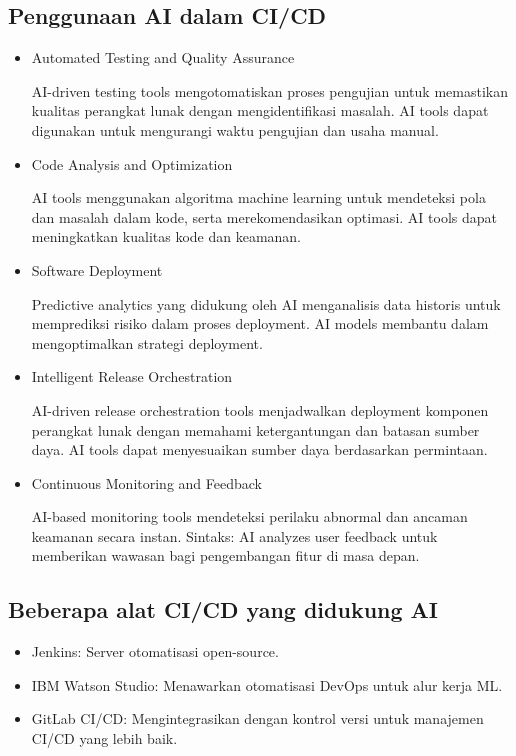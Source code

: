 \documentclass{article}
\begin{document}
\subsection{Penggunaan AI dalam CI/CD}
\begin{itemize}
    \item Automated Testing and Quality Assurance

          AI-driven testing tools mengotomatiskan proses pengujian untuk memastikan kualitas perangkat lunak dengan mengidentifikasi masalah. AI tools dapat digunakan untuk mengurangi waktu pengujian dan usaha manual.
    \item Code Analysis and Optimization

          AI tools menggunakan algoritma machine learning untuk mendeteksi pola dan masalah dalam kode, serta merekomendasikan optimasi. AI tools dapat meningkatkan kualitas kode dan keamanan.
    \item Software Deployment

          Predictive analytics yang didukung oleh AI menganalisis data historis untuk memprediksi risiko dalam proses deployment. AI models membantu dalam mengoptimalkan strategi deployment.
    \item Intelligent Release Orchestration

          AI-driven release orchestration tools menjadwalkan deployment komponen perangkat lunak dengan memahami ketergantungan dan batasan sumber daya. AI tools dapat menyesuaikan sumber daya berdasarkan permintaan.
    \item Continuous Monitoring and Feedback

          AI-based monitoring tools mendeteksi perilaku abnormal dan ancaman keamanan secara instan. Sintaks: AI analyzes user feedback untuk memberikan wawasan bagi pengembangan fitur di masa depan.
\end{itemize}

\subsection{Beberapa alat CI/CD yang didukung AI}
\begin{itemize}
    \item Jenkins: Server otomatisasi open-source.
    \item IBM Watson Studio: Menawarkan otomatisasi DevOps untuk alur kerja ML.
    \item GitLab CI/CD: Mengintegrasikan dengan kontrol versi untuk manajemen CI/CD yang lebih baik.
\end{itemize}
\end{document}
